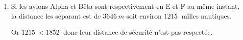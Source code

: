 \documentclass[10pt]{article}
\providecommand{\np}[2][]{{#2~#1}}
\begin{document}
\begin{enumerate}
\begin{enumerate}
$\begin{aligned} \mathrm{EF} & =\sqrt{\left(x_\mathrm{F}-x_\mathrm{E}\right)^2+\left(y_\mathrm{F}-y_\mathrm{E}\right)^2+\left(z_\mathrm{F}-z_\mathrm{E}\right)^2}\\
\mathrm{EF} &=\sqrt{\left(-1-(-3)\right)^2+\left(-3-(-1)\right)^2+\left(3-1\right)^2}\\
	\mathrm{EF}& =\sqrt{\left(2\right)^2+\left(-2\right)^2+\left(2\right)^2}\\
	\mathrm{EF}&=\sqrt{4+4+4}\\
	\mathrm{EF}&= \sqrt{12}=2\sqrt{3}
\end{aligned}$

d'où EF$\approx \np[km]{3,4641}$ soit EF$\approx \np[m]{3646}$ à 1~m près.
	\end{enumerate}
	\item Si les avions Alpha et Bêta sont respectivement en E et F au même instant, la distance les séparant est de $\np[m]{3646}$ soit environ $\np{1215}$ milles nautiques.

Or $\np{1215}<\np{1852}$ donc leur distance de sécurité n'est pas respectée.
\end{enumerate}
\end{document}
